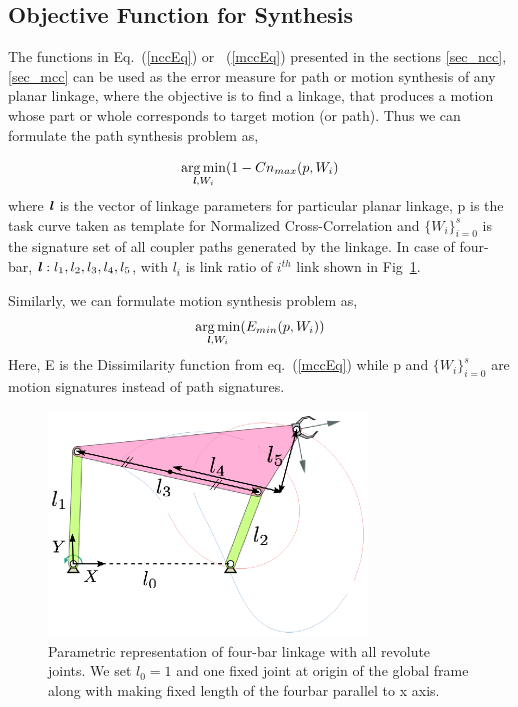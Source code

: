 \documentclass[twocolumn,10pt]{asme2e}
\newcommand{\req}[1]{(\ref{#1})}
\DeclareMathOperator*{\argminA}{arg\,min}
\begin{document}
\subsection{Objective Function for Synthesis}
The functions in Eq.~\req{nccEq} or ~\req{mccEq} presented in the sections \ref{sec_ncc}, \ref{sec_mcc} can be used as the error measure for path or motion synthesis of any planar linkage, where the objective is to find a linkage, that produces a motion whose part or whole corresponds to target motion (or path).
Thus we can formulate the path synthesis problem as,

\begin{equation}\label{objectiveFunPath}
  \argminA_{\textbf{\emph{l}}, W_i} (1 - Cn_{max}(p, W_i)
\end{equation}
where $\textbf{\emph{l}}$ is the vector of linkage parameters for particular planar linkage, p is the task curve taken as template for Normalized Cross-Correlation and ${\{W_i\}}_{i=0}^{s}$ is the signature set of all coupler paths generated by the linkage.
In case of four-bar, $\textbf{\emph{l}}: l_1, l_2, l_3, l_4, l_5$, with $l_i$ is link ratio of $i^{th}$ link shown in Fig~\ref{fourbar}.

Similarly, we can formulate motion synthesis problem as,
\begin{equation}\label{objectiveFunMotion}
  \argminA_{\textbf{\emph{l}}, W_i} (E_{min}(p, W_i))
\end{equation}
Here, E is the Dissimilarity function from eq.~\req{mccEq} while p and ${\{W_i\}}_{i=0}^{s}$ are motion signatures instead of path signatures.

\begin{figure}
\centering
\includegraphics[width=240pt]{figure/fig_fourbar.eps}
  \caption{Parametric representation of four-bar linkage with all revolute joints. We set $l_0 = 1$ and one fixed joint at origin of the global frame along with making fixed length of the fourbar parallel to x axis.}
\label{fourbar}
\end{figure}
\end{document}
